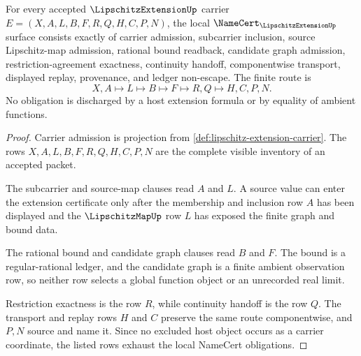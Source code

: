 \begin{theorem}
\label{thm:lipschitz-extension-namecert-obligations}
For every accepted $\LipschitzExtensionUp$ carrier $E=(X,A,L,B,F,R,Q,H,C,P,N)$, the local $\NameCert_{\LipschitzExtensionUp}$ surface consists exactly of carrier admission, subcarrier inclusion, source Lipschitz-map admission, rational bound readback, candidate graph admission, restriction-agreement exactness, continuity handoff, componentwise transport, displayed replay, provenance, and ledger non-escape. The finite route is
$$
X,A \longmapsto L \longmapsto B \longmapsto F \longmapsto R,Q \longmapsto H,C,P,N .
$$
No obligation is discharged by a host extension formula or by equality of ambient functions.
\end{theorem}
\begin{proof}
Carrier admission is projection from \autoref{def:lipschitz-extension-carrier}. The rows $X,A,L,B,F,R,Q,H,C,P,N$ are the complete visible inventory of an accepted packet.

The subcarrier and source-map clauses read $A$ and $L$. A source value can enter the extension certificate only after the membership and inclusion row $A$ has been displayed and the $\LipschitzMapUp$ row $L$ has exposed the finite graph and bound data.

The rational bound and candidate graph clauses read $B$ and $F$. The bound is a regular-rational ledger, and the candidate graph is a finite ambient observation row, so neither row selects a global function object or an unrecorded real limit.

Restriction exactness is the row $R$, while continuity handoff is the row $Q$. The transport and replay rows $H$ and $C$ preserve the same route componentwise, and $P,N$ source and name it. Since no excluded host object occurs as a carrier coordinate, the listed rows exhaust the local NameCert obligations.
\end{proof}

